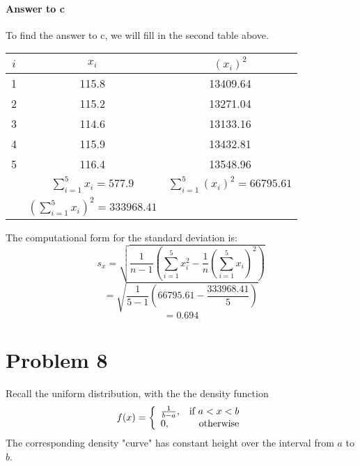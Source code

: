\documentclass{article}
\begin{document}
	\paragraph{Answer to c} To find the answer to c, we will fill in the second table above.
	\begin{table}[!htb]
	\begin{tabular}{ | c | c | c | } \hline
		$i$ & $x_i$ & $(x_i)^2$ \\ \hline
		1 & 115.8 & 13409.64 \\
		2 & 115.2 & 13271.04 \\
		3 & 114.6 & 13133.16 \\
		4 & 115.9 & 13432.81 \\
		5 & 116.4 & 13548.96 \\ \hline
		& $\sum_{i=1}^{5} x_i =577.9$ & $\sum_{i=1}^{5} (x_i)^2 =66795.61$ \\
		& $(\sum_{i=1}^{5} x_i)^2 =333968.41$ & \\ \hline
	\end{tabular}
	\end{table}
	
	The computational form for the standard deviation is:
	\begin{displaymath}
		s_x = \sqrt{\frac{1}{n-1}\left(\sum_{i=1}^{5}x_i^2-\frac{1}{n}\left(\sum_{i=1}^{5}x_i
		\right)^2\right)}
	\end{displaymath}
	\begin{displaymath}
		= \sqrt{\frac{1}{5-1}\left(66795.61 - \frac{333968.41}{5}\right)}
	\end{displaymath}
	\begin{displaymath}
		= 0.694
	\end{displaymath}

\clearpage
\section*{Problem 8}

	Recall the uniform distribution, with the the density function
	\begin{displaymath}
		f(x) = \left\{
		\begin{array}{lr}
			\frac{1}{b-a}, & $if $ a < x < b \\
			0, & $otherwise$
		\end{array}
		\right.
	\end{displaymath}
	The corresponding density "curve" has constant height over the interval from $a$ to $b$. \\
\end{document}

